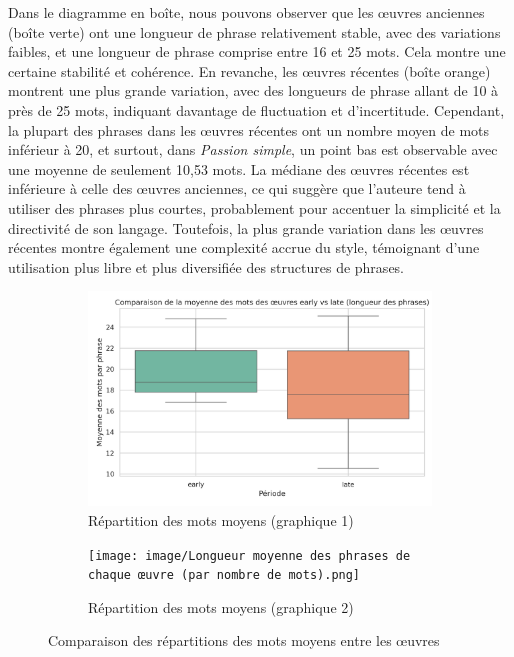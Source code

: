 Dans le diagramme en boîte, nous pouvons observer que les œuvres anciennes (boîte verte) ont une longueur de phrase relativement stable, avec des variations faibles, et une longueur de phrase comprise entre 16 et 25 mots. Cela montre une certaine stabilité et cohérence. En revanche, les œuvres récentes (boîte orange) montrent une plus grande variation, avec des longueurs de phrase allant de 10 à près de 25 mots, indiquant davantage de fluctuation et d'incertitude. Cependant, la plupart des phrases dans les œuvres récentes ont un nombre moyen de mots inférieur à 20, et surtout, dans \textit{Passion simple}, un point bas est observable avec une moyenne de seulement 10,53 mots. La médiane des œuvres récentes est inférieure à celle des œuvres anciennes, ce qui suggère que l'auteure tend à utiliser des phrases plus courtes, probablement pour accentuer la simplicité et la directivité de son langage. Toutefois, la plus grande variation dans les œuvres récentes montre également une complexité accrue du style, témoignant d'une utilisation plus libre et plus diversifiée des structures de phrases.\\
\begin{figure}[ht!]
    \centering
    \begin{subfigure}[b]{0.8\textwidth}
        \centering
        \includegraphics[width=\textwidth]{image/Comparaison de la moyenne des mots des galactiches early vs late (longueur des phrases).png}
        \caption{Répartition des mots moyens (graphique 1)}
        \label{fig:mots_moyens_boite}
    \end{subfigure}
    \vspace{1em} %
    \begin{subfigure}[b]{0.8\textwidth}
        \centering
        \texttt{[image: image/Longueur moyenne des phrases de chaque œuvre (par nombre de mots).png]}
        \caption{Répartition des mots moyens (graphique 2)}
        \label{fig:mots_moyens_barres}
    \end{subfigure}
    \caption{Comparaison des répartitions des mots moyens entre les œuvres}
    \label{fig:mots_moyens_comparison}
\end{figure}
